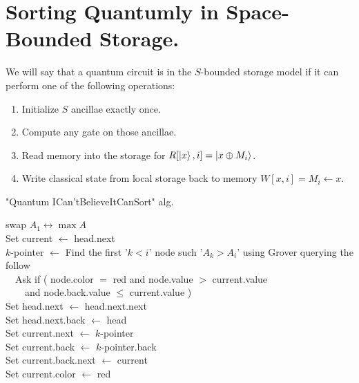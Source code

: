 \documentclass[manuscript,screen,review]{acmart}
\begin{document}
\section{Sorting Quantumly in Space-Bounded Storage.}
\begin{definition}
  We will say that a quantum circuit is in the $S$-bounded storage model if it can perform one of the following operations: 
  \begin{enumerate}
    \item Initialize $S$ ancillae exactly once. 
    \item Compute any gate on those ancillae. 
    \item Read memory into the storage for $R[\ket{x}, i] = \ket{x \oplus M_{i}}$. 
    \item Write classical state from local storage back to memory $W[x, i] = M_{i} \leftarrow x$. 
  \end{enumerate}
\end{definition}
\begin{algorithm}
\SetAlgoLined
{}
\caption{ "Quantum ICan'tBelieveItCanSort"  alg.}\label{alg:alg3}
swap $A_{1} \leftrightarrow \max A$ \\
 {
    Set current $\leftarrow$ head.next \\

    $k$-pointer $\leftarrow$ Find the first '$k< i$' node such '$A_{k} > A_{i}$' using Grover querying the follow \\
    \ \ Ask if ( node.color $=$ red and node.value $ > $ current.value \\ 
    \ \ \ \ and node.back.value $\le$ current.value ) \\ 

    Set head.next $\leftarrow$ head.next.next \\
    Set head.next.back $\leftarrow$ head\\
    Set current.next $\leftarrow$ $k$-pointer \\
    Set current.back $\leftarrow$ $k$-pointer.back \\
    Set current.back.next $\leftarrow$ current \\ 
    Set current.color $\leftarrow$ red
}
\end{algorithm}
\printbibliography
\end{document}
